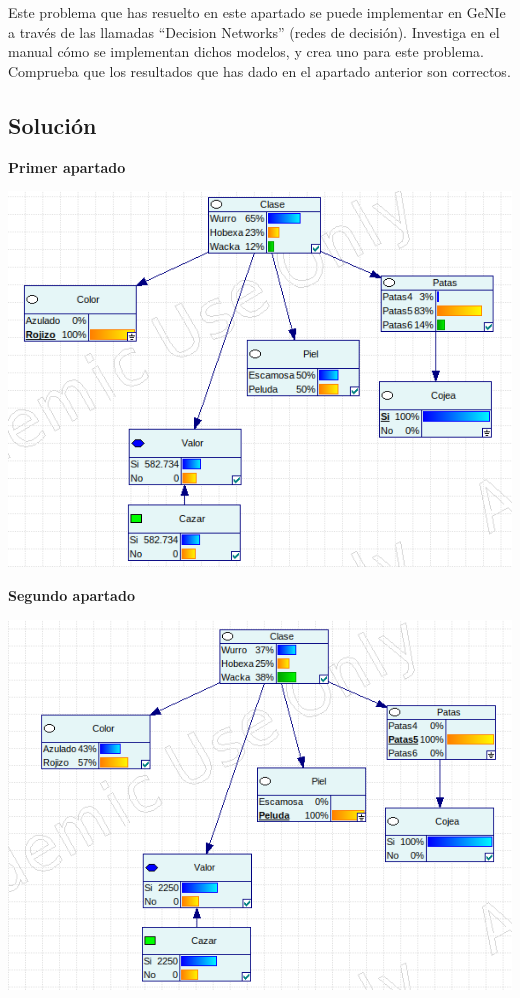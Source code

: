 \documentclass{article}
\begin{document}
Este problema que has resuelto en este apartado se puede implementar en GeNIe a través de las
llamadas “Decision Networks” (redes de decisión). Investiga en el manual cómo se implementan
dichos modelos, y crea uno para este problema. Comprueba que los resultados que has dado en
el apartado anterior son correctos. 

\subsection{Solución}

\textbf{Primer apartado}

\begin{center}
\includegraphics[scale=0.5]{a.png}
\end{center}

\newpage

\textbf{Segundo apartado}

\begin{center}
\includegraphics[scale=0.5]{b.png}
\end{center}
\end{document}
